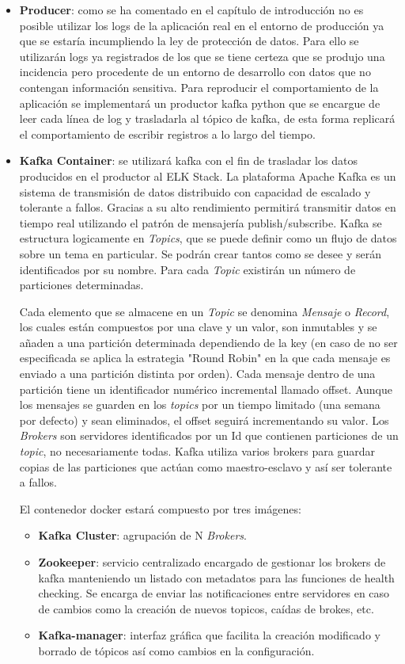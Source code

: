 \begin{itemize}
\item \textbf{Producer}: como se ha comentado en el capítulo de introducción no es posible utilizar los logs de la aplicación real en el entorno de producción ya que se estaría incumpliendo la ley de protección de datos. Para ello se utilizarán logs ya registrados de los que se tiene certeza que se produjo una incidencia pero procedente de un entorno de desarrollo con datos que no contengan información sensitiva. Para reproducir el comportamiento de la aplicación se implementará un productor kafka python que se encargue de leer cada línea de log y trasladarla al tópico de kafka, de esta forma replicará el comportamiento de escribir registros a lo largo del tiempo. 

\item \textbf{Kafka Container}: se utilizará kafka con el fin de trasladar los datos producidos en el productor al ELK Stack. La plataforma Apache Kafka es un sistema de transmisión de datos distribuido con capacidad de escalado y tolerante a fallos. Gracias a su alto rendimiento permitirá transmitir datos en tiempo real utilizando el patrón de mensajería publish/subscribe. Kafka se estructura logicamente en \textit{Topics}, que se puede definir como un flujo de datos sobre un tema en particular. Se podrán crear tantos como se desee y serán identificados por su nombre. Para cada \textit{Topic} existirán un número de particiones determinadas.

Cada elemento que se almacene en un \textit{Topic} se denomina \textit{Mensaje} o \textit{Record}, los cuales están compuestos por una clave y un valor, son inmutables y se añaden a una partición determinada dependiendo de la key (en caso de no ser especificada se aplica la estrategia "Round Robin" en la que cada mensaje es enviado a una partición distinta por orden). Cada mensaje dentro de una partición tiene un identificador numérico incremental llamado offset. Aunque los mensajes se guarden en los \textit{topics} por un tiempo limitado (una semana por defecto) y sean eliminados, el offset seguirá incrementando su valor. Los \textit{Brokers} son servidores identificados por un Id que contienen particiones de un \textit{topic}, no necesariamente todas. Kafka utiliza varios brokers para guardar copias de las particiones que actúan como maestro-esclavo y así ser tolerante a fallos. 

El contenedor docker estará compuesto por tres imágenes:

\begin{itemize}
\item \textbf{Kafka Cluster}: agrupación de N \textit{Brokers}.
\item \textbf{Zookeeper}: servicio centralizado encargado de gestionar los brokers de kafka manteniendo un listado con metadatos para las funciones de health checking. Se encarga de enviar las notificaciones entre servidores en caso de cambios como la creación de nuevos topicos, caídas de brokes, etc.
\item \textbf{Kafka-manager}: interfaz gráfica que facilita la creación modificado y borrado de tópicos así como cambios en la configuración.
\end{itemize}


\end{itemize}
